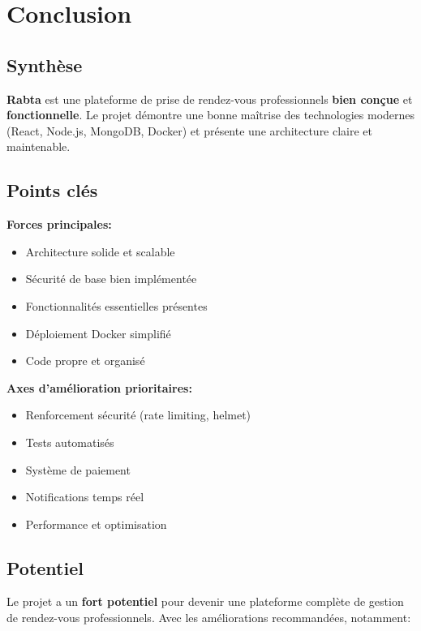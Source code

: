 \documentclass[12pt,a4paper]{article}
\begin{document}
\section{Conclusion}

\subsection{Synthèse}

\textbf{Rabta} est une plateforme de prise de rendez-vous professionnels \textbf{bien conçue} et \textbf{fonctionnelle}. Le projet démontre une bonne maîtrise des technologies modernes (React, Node.js, MongoDB, Docker) et présente une architecture claire et maintenable.

\subsection{Points clés}

\textbf{Forces principales:}
\begin{itemize}
    \item[\checkmark] Architecture solide et scalable
    \item[\checkmark] Sécurité de base bien implémentée
    \item[\checkmark] Fonctionnalités essentielles présentes
    \item[\checkmark] Déploiement Docker simplifié
    \item[\checkmark] Code propre et organisé
\end{itemize}

\textbf{Axes d'amélioration prioritaires:}
\begin{itemize}
    \item Renforcement sécurité (rate limiting, helmet)
    \item Tests automatisés
    \item Système de paiement
    \item Notifications temps réel
    \item Performance et optimisation
\end{itemize}

\subsection{Potentiel}

Le projet a un \textbf{fort potentiel} pour devenir une plateforme complète de gestion de rendez-vous professionnels. Avec les améliorations recommandées, notamment:
\end{document}
